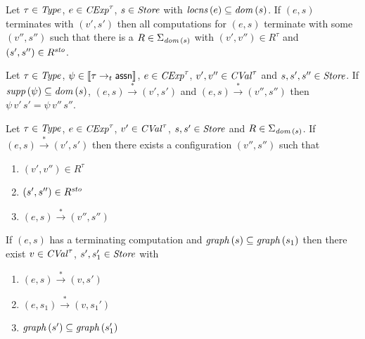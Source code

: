 \documentclass[12pt,a4paper]{report}
\newcommand{\CExp}{\nstyle{CExp}}
\newcommand{\CVal}{\nstyle{CVal}}
\newcommand{\sto}{\nstyle{sto}}
\begin{document}
\begin{lemma}
  Let $\tau\in\mathit{Type}$, $e \in \CExp^\tau$, $s\in\mathit{Store}$ with $\mathit{locns}\,(e) \subseteq \mathit{dom}\,(s)$.
  If $(e,s)$ terminates with $(v',s')$ then all computations for $(e,s)$ terminate with some
  $(v'',s'')$ such that there is a $R \in \Sigma_{\mathit{dom}\,(s)}$ with $(v',v'')\in R^\tau$ and $(s',s'') \in R^\sto$.
\end{lemma}

\begin{lemma}
  Let $\tau\in\mathit{Type}$, $\psi\in\llbracket\tau\rightarrow_t\mathsf{assn}\rrbracket$,
  $e\in\CExp^\tau$, $v',v''\in\CVal^\tau$ and $s,s',s''\in\mathit{Store}$.
  If $\mathit{supp}\,(\psi) \subseteq \mathit{dom}\,(s)$, $(e,s)\xrightarrow*(v',s')$
  and $(e,s)\xrightarrow*(v'',s'')$ then $\psi\,v'\,s'=\psi\,v''\,s''$.
\end{lemma}

\begin{lemma}
  Let $\tau\in\mathit{Type}$, $e\in\CExp^\tau$, $v'\in\CVal^\tau$, $s,s'\in\mathit{Store}$
  and $R \in \Sigma_{\mathit{dom}\,(s)}$. If $(e,s)\xrightarrow*(v',s')$ then there
  exists a configuration $(v'',s'')$ such that
  \begin{enumerate}
    \item $(v',v'')\in R^\tau$
    \item $(s',s'')\in R^\sto$
    \item $(e,s) \xrightarrow* (v'',s'')$
  \end{enumerate}
\end{lemma}

\begin{lemma}
  If $(e,s)$ has a terminating computation and $\mathit{graph}\,(s) \subseteq \mathit{graph}\,(s_1)$ then
  there exist $v\in\CVal^\tau$, $s',s_1'\in\mathit{Store}$ with
  \begin{enumerate}
    \item $(e,s) \xrightarrow* (v,s')$
    \item $(e,s_1) \xrightarrow* (v,s_1')$
    \item $\mathit{graph}\,(s') \subseteq \mathit{graph}\,(s_1')$
  \end{enumerate}
\end{lemma}
\end{document}
